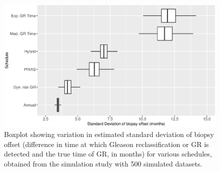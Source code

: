 \begin{figure}[!htb]
\centerline{\includegraphics[width=\columnwidth]{images/sim_study/offsetSDBoxPlot_all.eps}}
\caption{Boxplot showing variation in estimated standard deviation of biopsy offset (difference in time at which Gleason reclassification or GR is detected and the true time of GR, in months) for various schedules, obtained from the simulation study with 500 simulated datasets.}
\label{fig : offsetSDBoxPlot_all}
\end{figure}



